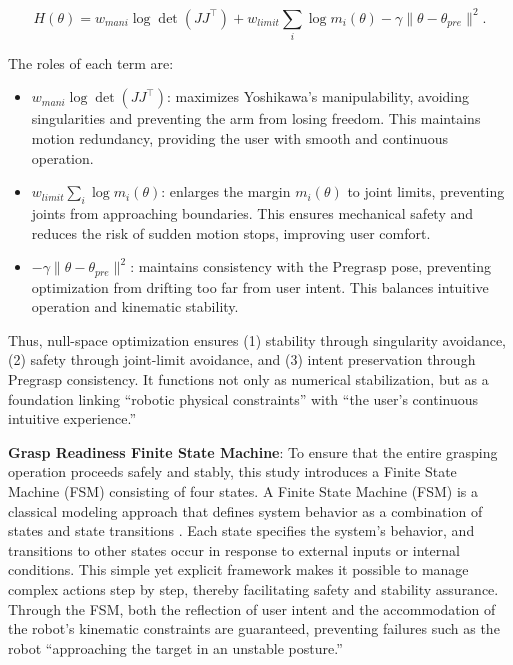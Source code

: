\documentclass[../../main.tex]{subfiles} %
\begin{document}
\begin{equation}
H(\theta) = w_{mani}\log\det(JJ^\top) + w_{limit}\sum_i \log m_i(\theta) - \gamma\|\theta-\theta_{pre}\|^2.
\end{equation}

The roles of each term are:
\begin{itemize}
  \item $w_{mani}\log\det(JJ^\top)$: maximizes Yoshikawa’s manipulability\cite{Yoshikawa}, 
  avoiding singularities and preventing the arm from losing freedom.  
  This maintains motion redundancy, providing the user with smooth and continuous operation.

  \item $w_{limit}\sum_i \log m_i(\theta)$: enlarges the margin $m_i(\theta)$ to 
  joint limits\cite{JointLimit}, preventing joints from approaching boundaries.  
  This ensures mechanical safety and reduces the risk of sudden motion stops, improving user comfort.

  \item $-\gamma\|\theta-\theta_{pre}\|^2$: maintains consistency with the Pregrasp pose, 
  preventing optimization from drifting too far from user intent.  
  This balances intuitive operation and kinematic stability.
\end{itemize}

Thus, null-space optimization ensures  
(1) stability through singularity avoidance,  
(2) safety through joint-limit avoidance, and  
(3) intent preservation through Pregrasp consistency.  
It functions not only as numerical stabilization, but as a foundation linking 
“robotic physical constraints” with “the user’s continuous intuitive experience.”  

\medskip
\textbf{Grasp Readiness Finite State Machine}:  
To ensure that the entire grasping operation proceeds safely and stably, this study introduces a Finite State Machine (FSM) consisting of four states.
A Finite State Machine (FSM) is a classical modeling approach that defines system behavior as a combination of states and state transitions \cite{FSM1} \cite{FSM2}.
Each state specifies the system’s behavior, and transitions to other states occur in response to external inputs or internal conditions.
This simple yet explicit framework makes it possible to manage complex actions step by step, thereby facilitating safety and stability assurance.
Through the FSM, both the reflection of user intent and the accommodation of the robot’s 
kinematic constraints are guaranteed, preventing failures such as the robot “approaching the target in an unstable posture.”
\end{document}
